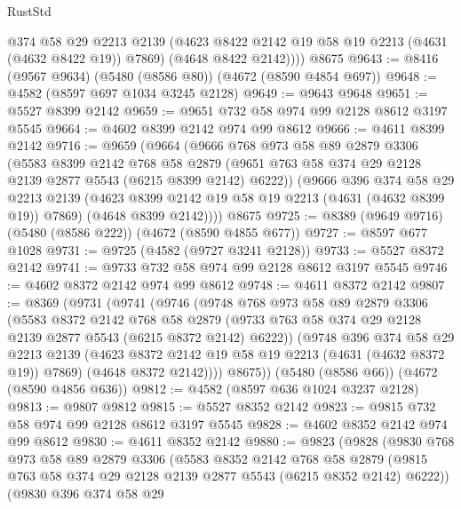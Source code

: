 \begin{lexlean}{RustStd}
\begin{coremodule}
          @374
          @58
          @29
          @2213
          @2139
          (@4623 @8422 @2142 @19 @58 @19 @2213 (@4631 (@4632 @8422 @19)) @7869)
          (@4648 @8422 @2142))))
    @8675
@9643 := @8416 (@9567 @9634) (@5480 (@8586 @80)) (@4672 (@8590 @4854 @697))
@9648 := @4582 (@8597 @697 @1034 @3245 @2128)
@9649 := @9643 @9648
@9651 := @5527 @8399 @2142
@9659 := @9651 @732 @58 @974 @99 @2128 @8612 @3197 @5545
@9664 := @4602 @8399 @2142 @974 @99 @8612
@9666 := @4611 @8399 @2142
@9716 := @9659
    (@9664
      (@9666
        @768
        @973
        @58
        @89
        @2879
        @3306
        (@5583
          @8399
          @2142
          @768
          @58
          @2879
          (@9651 @763 @58 @374 @29 @2128 @2139 @2877 @5543 (@6215 @8399 @2142) @6222))
        (@9666
          @396
          @374
          @58
          @29
          @2213
          @2139
          (@4623 @8399 @2142 @19 @58 @19 @2213 (@4631 (@4632 @8399 @19)) @7869)
          (@4648 @8399 @2142))))
    @8675
@9725 := @8389 (@9649 @9716) (@5480 (@8586 @222)) (@4672 (@8590 @4855 @677))
@9727 := @8597 @677 @1028
@9731 := @9725 (@4582 (@9727 @3241 @2128))
@9733 := @5527 @8372 @2142
@9741 := @9733 @732 @58 @974 @99 @2128 @8612 @3197 @5545
@9746 := @4602 @8372 @2142 @974 @99 @8612
@9748 := @4611 @8372 @2142
@9807 := @8369
    (@9731
      (@9741
        (@9746
          (@9748
            @768
            @973
            @58
            @89
            @2879
            @3306
            (@5583
              @8372
              @2142
              @768
              @58
              @2879
              (@9733 @763 @58 @374 @29 @2128 @2139 @2877 @5543 (@6215 @8372 @2142) @6222))
            (@9748
              @396
              @374
              @58
              @29
              @2213
              @2139
              (@4623 @8372 @2142 @19 @58 @19 @2213 (@4631 (@4632 @8372 @19)) @7869)
              (@4648 @8372 @2142))))
        @8675))
    (@5480 (@8586 @66))
    (@4672 (@8590 @4856 @636))
@9812 := @4582 (@8597 @636 @1024 @3237 @2128)
@9813 := @9807 @9812
@9815 := @5527 @8352 @2142
@9823 := @9815 @732 @58 @974 @99 @2128 @8612 @3197 @5545
@9828 := @4602 @8352 @2142 @974 @99 @8612
@9830 := @4611 @8352 @2142
@9880 := @9823
    (@9828
      (@9830
        @768
        @973
        @58
        @89
        @2879
        @3306
        (@5583
          @8352
          @2142
          @768
          @58
          @2879
          (@9815 @763 @58 @374 @29 @2128 @2139 @2877 @5543 (@6215 @8352 @2142) @6222))
        (@9830
          @396
          @374
          @58
          @29

\end{coremodule}
\end{lexlean}
